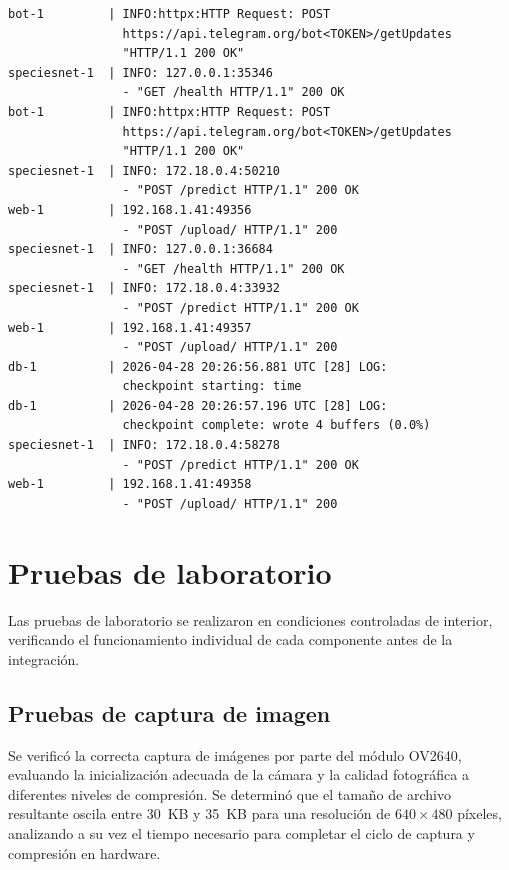 \documentclass[a4paper, 12pt]{report}
\begin{document}
\begin{lstlisting}[caption={Extracto de los registros del servidor durante la recepción y procesamiento de imágenes.}, label=lst:log-servidor, numbers=none, basicstyle=\ttfamily\scriptsize, breaklines=true]
bot-1         | INFO:httpx:HTTP Request: POST
                https://api.telegram.org/bot<TOKEN>/getUpdates
                "HTTP/1.1 200 OK"
speciesnet-1  | INFO: 127.0.0.1:35346
                - "GET /health HTTP/1.1" 200 OK
bot-1         | INFO:httpx:HTTP Request: POST
                https://api.telegram.org/bot<TOKEN>/getUpdates
                "HTTP/1.1 200 OK"
speciesnet-1  | INFO: 172.18.0.4:50210
                - "POST /predict HTTP/1.1" 200 OK
web-1         | 192.168.1.41:49356
                - "POST /upload/ HTTP/1.1" 200
speciesnet-1  | INFO: 127.0.0.1:36684
                - "GET /health HTTP/1.1" 200 OK
speciesnet-1  | INFO: 172.18.0.4:33932
                - "POST /predict HTTP/1.1" 200 OK
web-1         | 192.168.1.41:49357
                - "POST /upload/ HTTP/1.1" 200
db-1          | 2026-04-28 20:26:56.881 UTC [28] LOG:
                checkpoint starting: time
db-1          | 2026-04-28 20:26:57.196 UTC [28] LOG:
                checkpoint complete: wrote 4 buffers (0.0%)
speciesnet-1  | INFO: 172.18.0.4:58278
                - "POST /predict HTTP/1.1" 200 OK
web-1         | 192.168.1.41:49358
                - "POST /upload/ HTTP/1.1" 200
\end{lstlisting}

\section{Pruebas de laboratorio}

Las pruebas de laboratorio se realizaron en condiciones controladas de
interior, verificando el funcionamiento individual de cada componente
antes de la integración.

\subsection{Pruebas de captura de imagen}

Se verificó la correcta captura de imágenes por parte del módulo OV2640, evaluando la inicialización adecuada de la cámara y la calidad fotográfica a diferentes niveles de compresión. Se determinó que el tamaño de archivo resultante oscila entre \qty{30}{KB} y \qty{35}{KB} para una resolución de $640\times480$ píxeles, analizando a su vez el tiempo necesario para completar el ciclo de captura y compresión en hardware.
\end{document}
